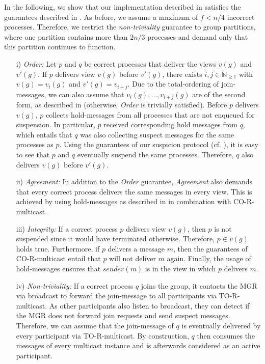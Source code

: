 \documentclass[runningheads]{llncs}
\begin{document}
In the following, we show that our implementation described in  satisfies the guarantees described in \cite[p.~772-773]{ds_book}. As before, we assume a maximum of $f < n/4$ incorrect processes. Therefore, we restrict the \textit{non-triviality} guarantee to group partitions, where one partition contains more than $2n/3$ processes and demand only that this partition continues to function.
\begin{enumerate}
    \item[i)] \textit{Order:} Let $p$ and $q$ be correct processes that deliver the views $v(g)$ and $v'(g)$. If $p$ delivers view $v(g)$ before $v'(g)$, there exists $i, j \in \mathbb{N}_{\geq 1}$ with $v(g) = v_i(g)$ and $v'(g) = v_{i+j}$. Due to the total-ordering of join-messages, we can also assume that $v_i(g), \ldots, v_{i+j}(g)$ are of the second form, as described in  (otherwise, \textit{Order} is trivially satisfied). Before $p$ delivers $v(g)$, $p$ collects hold-messages from all processes that are not enqueued for suspension. In particular, $p$ received corresponding hold messages from $q$, which entails that $q$ was also collecting suspect messages for the same processes as $p$. Using the guarantees of our suspicion protocol (cf. ), it is easy to see that $p$ and $q$ eventually suspend the same processes. Therefore, $q$ also delivers $v(g)$ before $v'(g)$.
    \item[ii)] \textit{Agreement:} In addition to the \textit{Order} guarantee, \textit{Agreement} also demands that every correct process delivers the same messages in every view. This is achieved by using hold-messages as described in  in combination with CO-R-multicast. 
    \item[iii)] \textit{Integrity:} If a correct process $p$ delivers view $v(g)$, then $p$ is not suspended since it would have terminated otherwise. Therefore, $p \in v(g)$ holds true. Furthermore, if $p$ delivers a message $m$, then the guarantees of CO-R-multicast entail that $p$ will not deliver $m$ again. Finally, the usage of hold-messages ensures that $sender(m)$ is in the view in which $p$ delivers $m$.
    \item[iv)] \textit{Non-triviality:} If a correct process $q$ joins the group, it contacts the MGR via broadcast to forward the join-message to all participants via TO-R-multicast. As other participants also listen to broadcast, they can detect if the MGR does not forward join requests and send suspect messages. Therefore, we can assume that the join-message of $q$ is eventually delivered by every participant via TO-R-multicast. By construction, $q$ then consumes the messages of every multicast instance and is afterwards considered as an active participant.
    

\end{enumerate}
\end{document}
